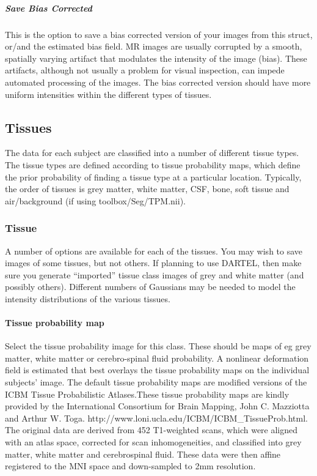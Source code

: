 \subparagraph{Save Bias Corrected}
This is the option to save a bias corrected version of your images from this struct, or/and the estimated bias field. MR images are usually corrupted by a smooth, spatially varying artifact that modulates the intensity of the image (bias). These artifacts, although not usually a problem for visual inspection, can impede automated processing of the images.  The bias corrected version should have more uniform intensities within the different types of tissues.


\subsection{Tissues}
The data for each subject are classified into a number of different tissue types.  The tissue types are defined according to tissue probability maps, which define the prior probability of finding a tissue type at a particular location. Typically, the order of tissues is grey matter, white matter, CSF, bone, soft tissue and air/background (if using toolbox/Seg/TPM.nii).


\subsubsection{Tissue}
A number of options are available for each of the tissues.  You may wish to save images of some tissues, but not others. If planning to use DARTEL, then make sure you generate ``imported'' tissue class images of grey and white matter (and possibly others).  Different numbers of Gaussians may be needed to model the intensity distributions of the various tissues.


\paragraph{Tissue probability map}
Select the tissue probability image for this class. These should be maps of eg grey matter, white matter or cerebro-spinal fluid probability. A nonlinear deformation field is estimated that best overlays the tissue probability maps on the individual subjects' image. The default tissue probability maps are modified versions of the ICBM Tissue Probabilistic Atlases.These tissue probability maps are kindly provided by the International Consortium for Brain Mapping, John C. Mazziotta and Arthur W. Toga. http://www.loni.ucla.edu/ICBM/ICBM\_TissueProb.html. The original data are derived from 452 T1-weighted scans, which were aligned with an atlas space, corrected for scan inhomogeneities, and classified into grey matter, white matter and cerebrospinal fluid. These data were then affine registered to the MNI space and down-sampled to 2mm resolution.



